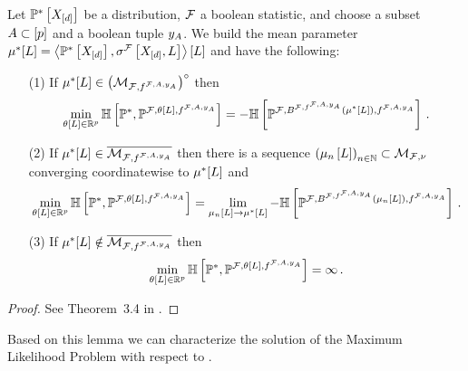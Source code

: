 \begin{lemma}
    \label{lem:minCrossEntropyExponential}
    Let $\mathbb{P}^*\left[X_{[d]}\right]$ be a distribution, $\mathcal{F}$ a boolean statistic, and choose a subset $A\subset[p]$ and a boolean tuple $y_{A}$.
    We build the mean parameter $\mu^*[L]=\left\langle \mathbb{P}^*\left[X_{[d]}\right],\sigma^{\mathcal{F}}\left[X_{[d]},L\right]\right\rangle \left[ L \right]$ and have the following:
    \begin{itemize}
        \item[(1)] If $\mu^*[L] \in {\left(\mathcal{M}_{\mathcal{F},f^{\mathcal{F},A,y_{A}}}\right)}^{\circ}$ then
            \begin{align*}
                \min_{\theta\left[L\right]\in\mathbb{R}^{p}} \mathbb{H}\left[\mathbb{P}^*,\mathbb{P}^{\mathcal{F},\theta\left[L\right],f^{\mathcal{F},A,y_{A}}}\right]
                = -\mathbb{H}\left[\mathbb{P}^{\mathcal{F},B^{\mathcal{F},f^{\mathcal{F},A,y_{A}}}(\mu^*[L]),f^{\mathcal{F},A,y_{A}}}\right] \, .
            \end{align*}
        \item[(2)] If $\mu^*[L]\in\overline{\mathcal{M}_{\mathcal{F},f^{\mathcal{F},A,y_{A}}}}$ then there is a sequence $\left(\mu_{n}\left[L\right]\right)_{n\in\mathbb{N}}\subset\mathcal{M}_{\mathcal{F},\nu}$ converging coordinatewise to $\mu^*[L]$ and
            \begin{align*}
                \min_{\theta\left[L\right]\in\mathbb{R}^{p}} \mathbb{H}\left[\mathbb{P}^*,\mathbb{P}^{\mathcal{F},\theta\left[L\right],f^{\mathcal{F},A,y_{A}}}\right]
                = \lim_{\mu_{n}\left[L\right]\rightarrow\mu^*[L]}-\mathbb{H}\left[\mathbb{P}^{\mathcal{F},B^{\mathcal{F},f^{\mathcal{F},A,y_{A}}}(\mu_{n}\left[L\right]),f^{\mathcal{F},A,y_{A}}}\right] \, .
            \end{align*}
        \item[(3)] If $\mu^*[L]\notin\overline{\mathcal{M}_{\mathcal{F},f^{\mathcal{F},A,y_{A}}}}$ then
            \begin{align*}
                \min_{\theta\left[L\right]\in\mathbb{R}^{p}} \mathbb{H}\left[\mathbb{P}^*,\mathbb{P}^{\mathcal{F},\theta\left[L\right],f^{\mathcal{F},A,y_{A}}}\right]
                = \infty \, .
            \end{align*}
    \end{itemize}
\end{lemma}
\begin{proof}
    See Theorem~3.4 in \cite{wainwright_graphical_2008}.
\end{proof}

Based on this lemma we can characterize the solution of the Maximum Likelihood Problem  with respect to \HybridLogicNetworks{}.

